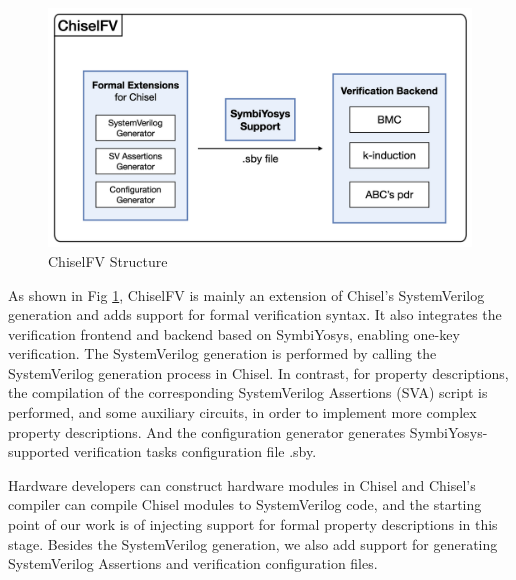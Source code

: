 \documentclass[conference]{IEEEtran}
\theoremstyle{definition}
\begin{document}
\begin{figure}[!htbp]
    \begin{center}
    \includegraphics[width=1\linewidth]{pics/structure.png}
    \caption{ChiselFV Structure}
    \label{fig: structure}
    \end{center}
\end{figure}

As shown in Fig \ref{fig: structure}, ChiselFV is mainly an extension of Chisel's SystemVerilog generation and adds support for formal verification syntax. It also integrates the verification frontend and backend based on SymbiYosys, enabling one-key verification. The SystemVerilog generation is performed by calling the SystemVerilog generation process in Chisel. In contrast, for property descriptions, the compilation of the corresponding SystemVerilog Assertions (SVA) script is performed, and some auxiliary circuits, in order to implement more complex property descriptions. And the configuration generator generates SymbiYosys-supported verification tasks configuration file .sby. 

Hardware developers can construct hardware modules in Chisel and Chisel's compiler can compile Chisel modules to SystemVerilog code, and the starting point of our work is of injecting support for formal property descriptions in this stage.
Besides the SystemVerilog generation, we also add support for generating SystemVerilog Assertions and verification configuration files.
\end{document}
